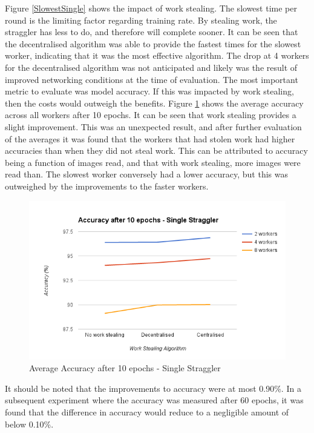 \documentclass[12pt]{article}
\begin{document}
Figure \ref{SlowestSingle} shows the impact of work stealing. The slowest time per round is the limiting factor regarding training rate. By stealing work, the straggler has less to do, and therefore will complete sooner. It can be seen that the decentralised algorithm was able to provide the fastest times for the slowest worker, indicating that it was the most effective algorithm. The drop at 4 workers for the decentralised algorithm was not anticipated and likely was the result of improved networking conditions at the time of evaluation.
\newline
\newline
\newline
The most important metric to evaluate was model accuracy. If this was impacted by work stealing, then the costs would outweigh the benefits. Figure \ref{AccuracySingle} shows the average accuracy across all workers after 10 epochs. It can be seen that work stealing provides a slight improvement. This was an unexpected result, and after further evaluation of the averages it was found that the workers that had stolen work had higher accuracies than when they did not steal work. This can be attributed to accuracy being a function of images read, and that with work stealing, more images were read than. The slowest worker conversely had a lower accuracy, but this was outweighed by the improvements to the faster workers.

\begin{figure}[H]
  \centering
  \includegraphics[width=6in]{AccuracySingle}
  \caption[]{Average Accuracy after 10 epochs - Single Straggler}
  \label{AccuracySingle}
\end{figure}

It should be noted that the improvements to accuracy were at most 0.90\%. In a subsequent experiment where the accuracy was measured after 60 epochs, it was found that the difference in accuracy would reduce to a negligible amount of below 0.10\%.
\end{document}
